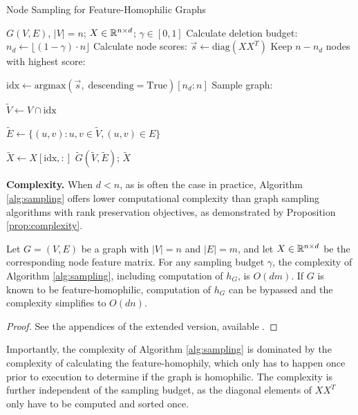 \begin{algorithm}[t]
\caption{Node Sampling for Feature-Homophilic Graphs}
\begin{algorithmic}
    \Require $G(V, E)$, $|V|=n$; $X \in {\mathbb R}^{n \times d}$; $\gamma \in [0,1]$
    \vspace{2pt}
    \State Calculate deletion budget: $n_d \gets \lfloor (1 - \gamma) \cdot n \rfloor$
    \State Calculate node scores: $\Vec{s} \gets \text{diag}(XX^T)$
    \State Keep $n-n_d$ nodes with  highest score:
    
    $\text{idx} \gets \text{argmax}(\Vec{s}, \;\text{descending}=\text{True})[n_d:n]$
    \State Sample graph:
    
    $\tilde{V} \gets V \cap \text{idx}$
    
    $\tilde{E} \gets \{(u,v): u,v \in \tilde{V}, (u,v) \in E \}$
    
    $\tilde{X} \gets X[\text{idx},:]$
    \vspace{2pt}
    \State \Return $\tilde{G}(\tilde{V}, \tilde{E})$; $\tilde{X}$
\end{algorithmic}
\label{alg:sampling}
\end{algorithm}

\noindent \textbf{Complexity.} When $d<n$, as is often the case in practice, Algorithm \ref{alg:sampling} offers lower computational complexity than graph sampling algorithms with rank preservation objectives, as demonstrated by Proposition \ref{prop:complexity}.

\begin{proposition} \label{prop:complexity}
    Let $G=(V,E)$ be a graph with $|V|=n$ and $|E|=m$, and let $X \in {\mathbb R}^{n\times d}$ be the corresponding node feature matrix. For any sampling budget $\gamma$, the complexity of Algorithm \ref{alg:sampling}, including computation of $h_G$, is $O(dm)$. If $G$ is known to be feature-homophilic, computation of $h_G$ can be bypassed and the complexity simplifies to $O(dn)$. 
\end{proposition}
\begin{proof}
See the appendices of the extended version, available .
\end{proof}

Importantly, the complexity of Algorithm \ref{alg:sampling} is dominated by the complexity of calculating the feature-homophily, which only has to happen once prior to execution to determine if the graph is homophilic. The complexity is further independent of the sampling budget, as the diagonal elements of $XX^T$ only have to be computed and sorted once. 

